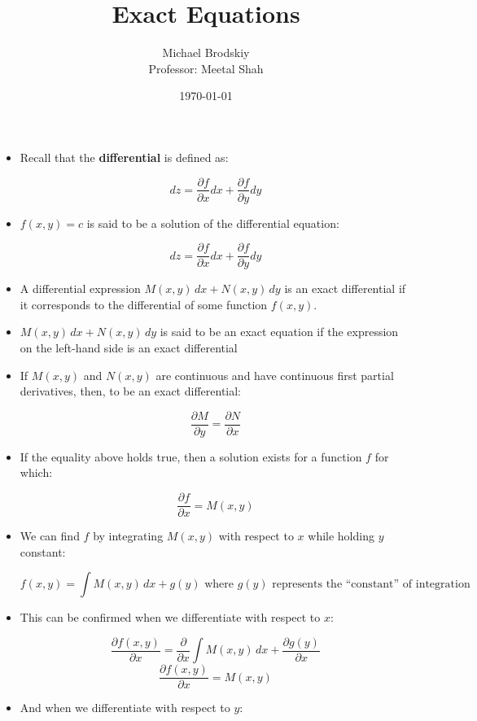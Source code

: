 \documentclass[12pt]{article}
\title{Exact Equations}
\date{\today}
\author{Michael Brodskiy\\ \small Professor: Meetal Shah}
\begin{document}
\maketitle

\begin{itemize}

  \item Recall that the \textbf{differential} is defined as:

    $$dz=\frac{\partial f}{\partial x}dx+\frac{\partial f}{\partial y}dy$$

  \item $f(x,y)=c$ is said to be a solution of the differential equation:

    $$dz=\frac{\partial f}{\partial x}dx+\frac{\partial f}{\partial y}dy$$

  \item A differential expression $M(x,y)\,dx+N(x,y)\,dy$ is an exact differential if it corresponds to the differential of some function $f(x,y)$.

  \item $M(x,y)\,dx+N(x,y)\,dy$ is said to be an exact equation if the expression on the left-hand side is an exact differential

  \item If $M(x,y)$ and $N(x,y)$ are continuous and have continuous first partial derivatives, then, to be an exact differential:

    $$\frac{\partial M}{\partial y}=\frac{\partial N}{\partial x}$$

  \item If the equality above holds true, then a solution exists for a function $f$ for which:

    $$\frac{\partial f}{\partial x}=M(x,y)$$

  \item We can find $f$ by integrating $M(x,y)$ with respect to $x$ while holding $y$ constant:

    $$f(x,y)=\int M(x,y)\,dx+g(y) \text{ where $g(y)$ represents the ``constant'' of integration}$$

  \item This can be confirmed when we differentiate with respect to $x$:

    $$\frac{\partial f(x,y)}{\partial x}=\frac{\partial}{\partial x}\int M(x,y)\,dx+ \frac{\partial g(y)}{\partial x}$$
    $$\frac{\partial f(x,y)}{\partial x}= M(x,y)$$

  \item And when we differentiate with respect to $y$:


\end{itemize}
\end{document}
